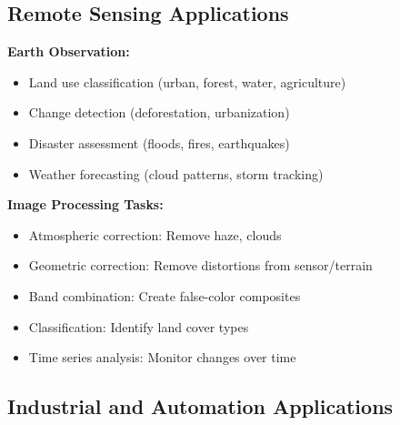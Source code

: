 \documentclass[12pt,a4paper]{article}
\begin{document}
\subsection{Remote Sensing Applications}

\begin{examplebox}
\textbf{Earth Observation:}
\begin{itemize}
    \item Land use classification (urban, forest, water, agriculture)
    \item Change detection (deforestation, urbanization)
    \item Disaster assessment (floods, fires, earthquakes)
    \item Weather forecasting (cloud patterns, storm tracking)
\end{itemize}

\textbf{Image Processing Tasks:}
\begin{itemize}
    \item Atmospheric correction: Remove haze, clouds
    \item Geometric correction: Remove distortions from sensor/terrain
    \item Band combination: Create false-color composites
    \item Classification: Identify land cover types
    \item Time series analysis: Monitor changes over time
\end{itemize}
\end{examplebox}

\subsection{Industrial and Automation Applications}
\end{document}
